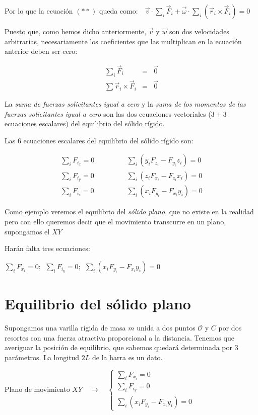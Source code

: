 Por lo que la ecuación $(**)$ queda como:$\quad \vec v \cdot \sum_i \vec F_i +\vec \omega \cdot \sum_i (\vec r_i \times \vec F_i)=0$

Puesto que, como hemos dicho anteriormente, $\vec v$ y $\vec w$ son dos velocidades arbitrarias, necesariamente los coeficientes que las multiplican en la ecuación anterior deben ser cero:

\begin{eqnarray}
\sum_i \vec F_i&=&\vec 0 \\
\sum \vec r_i \times \vec F_i&=&\vec 0
\end{eqnarray} 

La \emph{suma de fuerzas solicitantes igual a cero} y la \emph{suma de los momentos de las fuerzas solicitantes igual a cero} son las dos ecuaciones vectoriales ($3+3$ ecuaciones escalares) del equilibrio del sólido rígido.

Las $6$ ecuaciones escalares del equilibrio del sólido rígido son:

\begin{eqnarray*}
\sum_i F_{i_x}=0 &\quad \quad \quad & \sum_i (y_i F_{z_i}-F_{y_i}z_i)=0 \nonumber \\
\sum_i F_{i_y}=0 &\quad \quad \quad & \sum_i (z_i F_{x_i}-F_{z_i}x_i)=0 \nonumber \\
\sum_i F_{i_z}=0 &\quad \quad \quad & \sum_i (x_i F_{y_i}-F_{x_i}y_i)=0 \nonumber  	
\end{eqnarray*}

Como ejemplo veremos el equilibrio del \emph{sólido plano}, que no existe en la realidad pero con ello queremos decir que el movimiento transcurre en un plano, supongamos el $XY$ 

Harán falta tres ecuaciones: 

\hspace{2cm} $\displaystyle \sum_i F_{x_i}=0;\ \ \sum_i F_{i_y}=0; \ \ \sum_i (x_iF_{y_i}-F_{x_i}y_i)=0$
 

\section{Equilibrio del sólido plano}


Supongamos una varilla rígida de masa $m$ unida a dos puntos $\mathcal O$ y $C$ por dos resortes  con una fuerza atractiva proporcional a la distancia. Tenemos que averiguar la posición de equilibrio, que sabemos quedará determinada por 3 parámetros. La longitud $2L$ de la barra es un dato.

Plano de movimiento $XY \quad \to \quad \begin{cases}
 \sum_i F_{x_i}=0 \\ \sum_i F_{i_y}=0 \\ \sum_i (x_iF_{y_i}-F_{x_i}y_i)=0	 \end{cases}$
 
